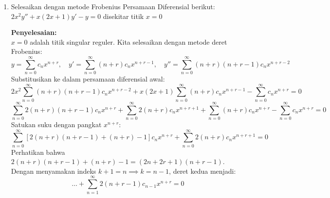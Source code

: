 \documentclass[11pt,a4paper]{article}
\begin{document}
\begin{enumerate}
        \textit{Untuk $k \geq 2$:}
        \begin{equation*}
          (k+2)(k+1) a_{k+2} - k(k+1) a_{k+1} - 4k a_k - 2a_k = 0
        \end{equation*}
        \begin{equation*}
          (k+2)(k+1) a_{k+2} - k(k+1) a_{k+1} - (4k+2) a_k = 0
        \end{equation*}
        Sehingga didapatkan relasi rekursi untuk $k \geq 2$:
        \begin{equation*}
          a_{k+2} = \frac{k(k+1) a_{k+1} + 2(2k+1) a_k}{(k+2)(k+1)}
        \end{equation*}

        Jadi, solusi deretnya dapat dituliskan sebagai:
        \begin{equation*}
          y(x) = a_0 + a_1 x + \left(a_0 - \frac{3}{2}\right) x^2 + \left(\frac{1}{3}a_0 + a_1 + \frac{1}{3}\right) x^3 + \dots
        \end{equation*}
        dimana $a_0$ dan $a_1$ adalah konstanta sembarang dari \textit{Initial Value}.

        \newpage

  \item Selesaikan dengan metode Frobenius Persamaan Diferensial berikut: $2x^2y'' + x(2x + 1)y' - y = 0$ disekitar titik $x = 0$

        \textbf{Penyelesaian:} \\
        $x=0$ adalah titik singular reguler. Kita selesaikan dengan metode deret Frobenius:
        \begin{equation*}
          y = \sum_{n=0}^{\infty} c_n x^{n+r}, \quad y' = \sum_{n=0}^{\infty} (n+r) c_n x^{n+r-1}, \quad y'' = \sum_{n=0}^{\infty} (n+r)(n+r-1) c_n x^{n+r-2}
        \end{equation*}
        Substitusikan ke dalam persamaan diferensial awal:
        \begin{equation*}
          2x^2 \sum_{n=0}^{\infty} (n+r)(n+r-1) c_n x^{n+r-2} + x(2x+1) \sum_{n=0}^{\infty} (n+r) c_n x^{n+r-1} - \sum_{n=0}^{\infty} c_n x^{n+r} = 0
        \end{equation*}
        \begin{equation*}
          \sum_{n=0}^{\infty} 2(n+r)(n+r-1) c_n x^{n+r} + \sum_{n=0}^{\infty} 2(n+r) c_n x^{n+r+1} + \sum_{n=0}^{\infty} (n+r) c_n x^{n+r} - \sum_{n=0}^{\infty} c_n x^{n+r} = 0
        \end{equation*}
        Satukan suku dengan pangkat $x^{n+r}$:
        \begin{equation*}
          \sum_{n=0}^{\infty} \left[2(n+r)(n+r-1) + (n+r) - 1\right] c_n x^{n+r} + \sum_{n=0}^{\infty} 2(n+r) c_n x^{n+r+1} = 0
        \end{equation*}
        Perhatikan bahwa $2(n+r)(n+r-1) + (n+r) - 1 = (2n+2r+1)(n+r-1)$.
        Dengan menyamakan indeks $k+1 = n \implies k = n-1$, deret kedua menjadi:
        \begin{equation*}
          \dots + \sum_{n=1}^{\infty} 2(n+r-1) c_{n-1} x^{n+r} = 0
        \end{equation*}


\end{enumerate}
\end{document}
